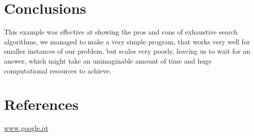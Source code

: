 \documentclass[...]{revdetua}
\begin{document}
\section{Conclusions}
This example was effective at showing the pros and cons of exhaustive search algorithms, we managed to make a very simple program, that works very well for smaller instances of our problem, but scales very poorly, leaving us to wait for an answer, which might take an unimaginable amount of time and huge computational resources to achieve.
\section{References}
\url{www.google.pt}
\end{document}
